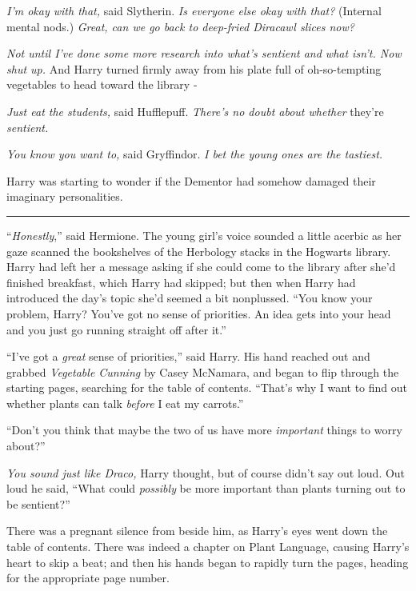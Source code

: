 \emph{I'm okay with that,} said Slytherin. \emph{Is everyone else okay with that?} (Internal mental nods.) \emph{Great, can we go back to deep-fried Diracawl slices now?}

\emph{Not until I've done some more research into what's sentient and what isn't. Now shut up.} And Harry turned firmly away from his plate full of oh-so-tempting vegetables to head toward the library -

\emph{Just eat the students,} said Hufflepuff. \emph{There's no doubt about whether} they're \emph{sentient.}

\emph{You know you want to,} said Gryffindor. \emph{I bet the young ones are the tastiest.}

Harry was starting to wonder if the Dementor had somehow damaged their imaginary personalities.

\begin{center}\rule{3in}{0.4pt}\end{center}

``\emph{Honestly},'' said Hermione. The young girl's voice sounded a little acerbic as her gaze scanned the bookshelves of the Herbology stacks in the Hogwarts library. Harry had left her a message asking if she could come to the library after she'd finished breakfast, which Harry had skipped; but then when Harry had introduced the day's topic she'd seemed a bit nonplussed. ``You know your problem, Harry? You've got no sense of priorities. An idea gets into your head and you just go running straight off after it.''

``I've got a \emph{great} sense of priorities,'' said Harry. His hand reached out and grabbed \emph{Vegetable Cunning} by Casey McNamara, and began to flip through the starting pages, searching for the table of contents. ``That's why I want to find out whether plants can talk \emph{before} I eat my carrots.''

``Don't you think that maybe the two of us have more \emph{important} things to worry about?''

\emph{You sound just like Draco,} Harry thought, but of course didn't say out loud. Out loud he said, ``What could \emph{possibly} be more important than plants turning out to be sentient?''

There was a pregnant silence from beside him, as Harry's eyes went down the table of contents. There was indeed a chapter on Plant Language, causing Harry's heart to skip a beat; and then his hands began to rapidly turn the pages, heading for the appropriate page number.


